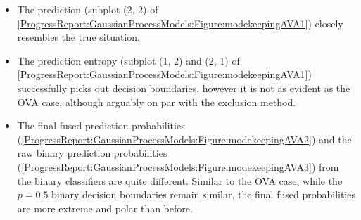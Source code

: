 				\begin{itemize}
					\item The prediction (subplot (2, 2) of \cref{ProgressReport:GaussianProcessModels:Figure:modekeepingAVA1}) closely resembles the true situation.
					\item The prediction entropy (subplot (1, 2) and (2, 1) of \cref{ProgressReport:GaussianProcessModels:Figure:modekeepingAVA1}) successfully picks out decision boundaries, however it is not as evident as the OVA case, although arguably on par with the exclusion method.
					\item The final fused prediction probabilities (\cref{ProgressReport:GaussianProcessModels:Figure:modekeepingAVA2}) and the raw binary prediction probabilities (\cref{ProgressReport:GaussianProcessModels:Figure:modekeepingAVA3}) from the binary classifiers are quite different. Similar to the OVA case, while the $p = 0.5$ binary decision boundaries remain similar, the final fused probabilities are more extreme and polar than before.
				\end{itemize}
